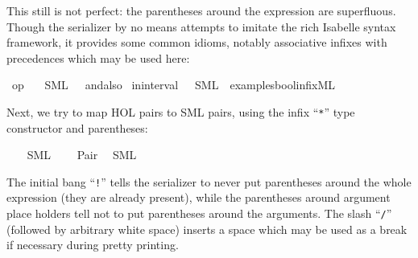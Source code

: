 \begin{isabellebody}
\begin{isamarkuptext}
  \noindent This still is not perfect: the parentheses
  around the  expression are superfluous.
  Though the serializer
  by no means attempts to imitate the rich Isabelle syntax
  framework, it provides some common idioms, notably
  associative infixes with precedences which may be used here:%
\end{isamarkuptext}%
\isamarkuptrue%
%
\isadelimtt
%
\endisadelimtt
%
\isatagtt
{}\isamarkupfalse%
\ {\isachardoublequoteopen}op\ {\isasymand}{\isachardoublequoteclose}\isanewline
\ \ {\isacharparenleft}SML\ \ {}\ {\isachardoublequoteopen}andalso{\isachardoublequoteclose}{\isacharparenright}%
\endisatagtt
{\isafoldtt}%
%
\isadelimtt
%
\endisadelimtt
\isanewline
\isanewline
{}\isamarkupfalse%
\ in{\isacharunderscore}interval\ \ \ SML\ \ {\isachardoublequoteopen}examples{\isacharslash}bool{\isacharunderscore}infix{\isachardot}ML{\isachardoublequoteclose}%
\begin{isamarkuptext}%

  \medskip

  Next, we try to map HOL pairs to SML pairs, using the
  infix ``\verb|*|'' type constructor and parentheses:%
\end{isamarkuptext}%
\isamarkuptrue%
%
\isadelimtt
%
\endisadelimtt
%
\isatagtt
{}\isamarkupfalse%
\ {\isacharasterisk}\isanewline
\ \ {\isacharparenleft}SML\ \ {}\ {\isachardoublequoteopen}{\isacharasterisk}{\isachardoublequoteclose}{\isacharparenright}\isanewline
{}\isamarkupfalse%
\ Pair\isanewline
\ \ {\isacharparenleft}SML\ {\isachardoublequoteopen}{\isacharbang}{\isacharparenleft}{\isacharparenleft}{\isacharunderscore}{\isacharparenright}{\isacharcomma}{\isacharslash}\ {\isacharparenleft}{\isacharunderscore}{\isacharparenright}{\isacharparenright}{\isachardoublequoteclose}{\isacharparenright}%
\endisatagtt
{\isafoldtt}%
%
\isadelimtt
%
\endisadelimtt
%
\begin{isamarkuptext}%
The initial bang ``\verb|!|'' tells the serializer to never put
  parentheses around the whole expression (they are already present),
  while the parentheses around argument place holders
  tell not to put parentheses around the arguments.
  The slash ``\verb|/|'' (followed by arbitrary white space)
  inserts a space which may be used as a break if necessary
  during pretty printing.


\end{isamarkuptext}
\end{isabellebody}
